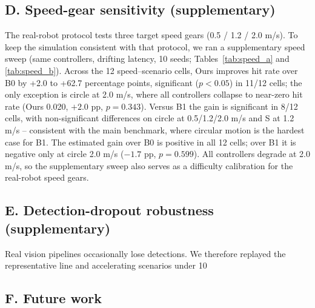 \documentclass[journal]{IEEEtran}
\begin{document}
\subsection*{D. Speed-gear sensitivity (supplementary)}

The real-robot protocol tests three target speed gears (0.5 / 1.2 / 2.0 m/s). To keep the simulation consistent with that protocol, we ran a supplementary speed sweep (same controllers, drifting latency, 10 seeds; Tables~\ref{tab:speed_a} and \ref{tab:speed_b}). Across the 12 speed--scenario cells, Ours improves hit rate over B0 by +2.0 to +62.7 percentage points, significant ($p<0.05$) in 11/12 cells; the only exception is circle at 2.0 m/s, where all controllers collapse to near-zero hit rate (Ours 0.020, $+2.0$ pp, $p=0.343$). Versus B1 the gain is significant in 8/12 cells, with non-significant differences on circle at 0.5/1.2/2.0 m/s and S at 1.2 m/s -- consistent with the main benchmark, where circular motion is the hardest case for B1. The estimated gain over B0 is positive in all 12 cells; over B1 it is negative only at circle 2.0 m/s ($-1.7$ pp, $p=0.599$). All controllers degrade at 2.0 m/s, so the supplementary sweep also serves as a difficulty calibration for the real-robot speed gears.

\subsection*{E. Detection-dropout robustness (supplementary)}

Real vision pipelines occasionally lose detections. We therefore replayed the representative line and accelerating scenarios under 10%

\subsection*{F. Future work}
\end{document}

